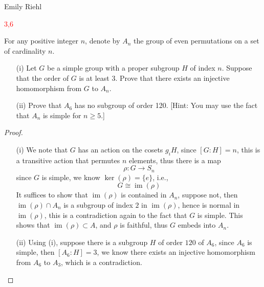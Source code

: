 \documentclass[openany]{book}
\DeclareMathOperator{\im}{im}
\begin{document}
Emily Riehl

\textcolor{red}{3,6}


\begin{prob}
    For any positive integer \( n \), denote by \( A_n \) the group of even permutations on a set of cardinality \( n \).

    \begin{enumerate}
        \item[(i)] Let \( G \) be a simple group with a proper subgroup \( H \) of index \( n \). Suppose that the order of \( G \) is at least 3. Prove that there exists an injective homomorphism from \( G \) to \( A_n \).
        
        \item[(ii)] Prove that \( A_6 \) has no subgroup of order 120. [Hint: You may use the fact that \( A_n \) is simple for \( n \geq 5 \).]
    \end{enumerate}
\end{prob}
\begin{proof}
    \begin{itemize}
        \item[(i)] We note that $G$ has an action on the cosets $g_iH$, since $[G:H]=n$, this is a transitive action that permutes $n$ elements, thus there is a map 
        \begin{equation*}
            \rho: G\to S_n
        \end{equation*}
        since $G$ is simple, we know $\ker(\rho)=\{e\}$, i.e., 
        \begin{equation*}
            G\cong\im(\rho)
        \end{equation*}
        It suffices to show that $\im(\rho)$ is contained in $A_n$, suppose not, then $\im(\rho)\cap A_n$ is a subgroup of index $2$ in $\im(\rho)$, hence is normal in $\im(\rho)$, this is a contradiction again to the fact that $G$ is simple. This shows that $\im(\rho)\subset A$, and $\rho$ is faithful, thus $G$ embeds into $A_n$.
        \item[(ii)] Using (i), suppose there is a subgroup $H$ of order $120$ of $A_6$, since $A_6$ is simple, then $[A_6: H]=3$, we know there exists an injective homomorphism from $A_6$ to $A_3$, which is a contradiction.
    \end{itemize}
\end{proof}
\end{document}
